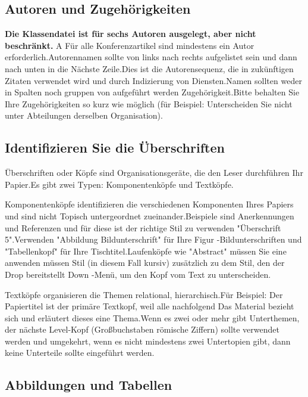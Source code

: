 \documentclass[conference]{IEEEtran}
\begin{document}
\subsection{Autoren und Zugehörigkeiten}
\textbf{Die Klassendatei ist für sechs Autoren ausgelegt, aber nicht beschränkt.} A
Für alle Konferenzartikel sind mindestens ein Autor erforderlich.Autorennamen
sollte von links nach rechts aufgelistet sein und dann nach unten in die
Nächste Zeile.Dies ist die Autorensequenz, die in zukünftigen Zitaten verwendet wird
und durch Indizierung von Diensten.Namen sollten weder in Spalten noch gruppen von aufgeführt werden
Zugehörigkeit.Bitte behalten Sie Ihre Zugehörigkeiten so kurz wie möglich (für
Beispiel: Unterscheiden Sie nicht unter Abteilungen derselben Organisation).

\subsection{Identifizieren Sie die Überschriften}
Überschriften oder Köpfe sind Organisationsgeräte, die den Leser durchführen
Ihr Papier.Es gibt zwei Typen: Komponentenköpfe und Textköpfe.

Komponentenköpfe identifizieren die verschiedenen Komponenten Ihres Papiers und sind nicht
Topisch untergeordnet zueinander.Beispiele sind Anerkennungen und
Referenzen und für diese ist der richtige Stil zu verwenden "Überschrift 5".Verwenden
"Abbildung Bildunterschrift" für Ihre Figur -Bildunterschriften und "Tabellenkopf" für Ihre
Tischtitel.Laufenköpfe wie "Abstract" müssen Sie eine anwenden müssen
Stil (in diesem Fall kursiv) zusätzlich zu dem Stil, den der Drop bereitstellt
Down -Menü, um den Kopf vom Text zu unterscheiden.

Textköpfe organisieren die Themen relational, hierarchisch.Für
Beispiel: Der Papiertitel ist der primäre Textkopf, weil alle nachfolgend
Das Material bezieht sich und erläutert dieses eine Thema.Wenn es zwei oder mehr gibt
Unterthemen, der nächste Level-Kopf (Großbuchstaben römische Ziffern) sollte verwendet werden
und umgekehrt, wenn es nicht mindestens zwei Untertopien gibt, dann keine Unterteile
sollte eingeführt werden.

\subsection{Abbildungen und Tabellen}
\end{document}
